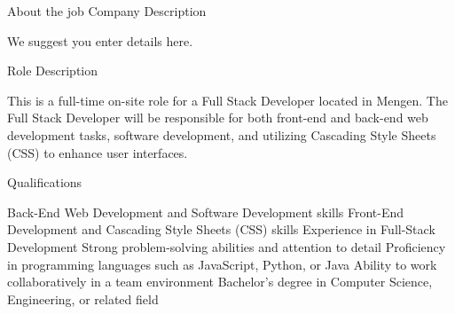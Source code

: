 About the job
Company Description
 
We suggest you enter details here.

 Role Description
 
This is a full-time on-site role for a Full Stack Developer located in Mengen. The Full Stack Developer will be responsible for both front-end and back-end web development tasks, software development, and utilizing Cascading Style Sheets (CSS) to enhance user interfaces.

 Qualifications
 
Back-End Web Development and Software Development skills
Front-End Development and Cascading Style Sheets (CSS) skills
Experience in Full-Stack Development
Strong problem-solving abilities and attention to detail
Proficiency in programming languages such as JavaScript, Python, or Java
Ability to work collaboratively in a team environment
Bachelor's degree in Computer Science, Engineering, or related field

